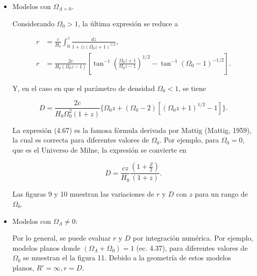 \documentclass[11pt]{article}
\begin{document}
    
    \begin{itemize}
	        \item Modelos con $\Omega_{\Lambda=0}$. 

		Considerando $\Omega_0 >1$, la última expresión se reduce a 
		
		\begin{align}
		    r &= \frac{c}{H_0} \int_0^z{\frac{dz}{1+z) (\Omega_0 z + 1)^{1/2}}}, \\
		    r& =  \frac{2c}{H_0 (\Omega_0 z -1)} \left[ \tan^{-1} \left(\frac{\Omega_0 z + 1}{\Omega_0 z -1} \right)^{1/2} - \tan^{-1} (\Omega_0 -1)^{-1/2} \right].
		\end{align}
     
     Y, en el caso en que el parámetro de densidad $\Omega_0 <1$, se tiene
     
     \begin{equation}
         D = \frac{2c}{H_0 \Omega_0^2( 1+z)} \{ \Omega_0 z+ (\Omega_0 - 2) [(\Omega_0 z+1)^{1/2} - 1 ] \}.
     \end{equation}
    
    La expresión (4.67) es la famosa fórmula derivada por Mattig (Mattig, 1959), la cual es correcta para diferentes valores de $\Omega_0$. Por ejemplo, para $\Omega_0 = 0$, que es el Universo de Milne, la expresión se convierte en 
    
    
    \begin{equation}
         D = \frac{cz}{H_0} \frac{\left( 1 + \frac{Z}{2} \right)}{(1+z)}.
    \end{equation}
    
    Las figuras 9 y 10 muestran las variaciones de $r$ y $D$ con $z$ para un rango de $\Omega_0$. 
    
    \item Modelos con $\Omega_{\Lambda} \neq 0$:
    
    Por lo general, se puede evaluar $r$ y $D$ por integración numérica. Por ejemplo, modelos planos donde $(\Omega_{\Lambda} + \Omega_0)=1$ (ec. 4.37), para diferentes valores de $\Omega_0$ se muestran el la figura 11. Debido a la geometría de estos modelos planos, $R'=\infty, r = D$.
    
    
    
    \end{itemize}
    
\end{document}
